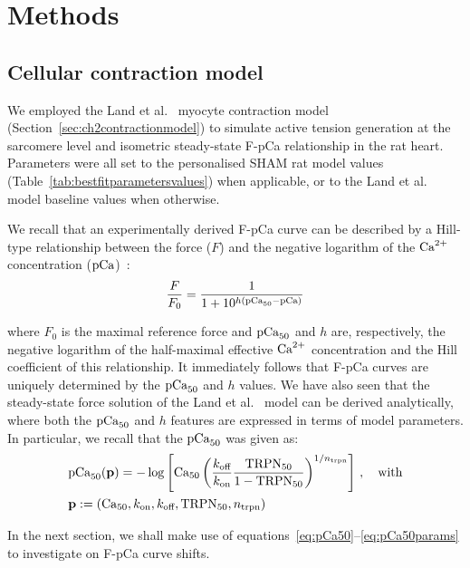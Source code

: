 %
%
%
\section{Methods}\label{sec:ch8methods}


%
%
%
\subsection{Cellular contraction model}\label{sec:cellcontr}
We employed the Land et al.~\cite{Land:2012} myocyte contraction model (Section~\ref{sec:ch2contractionmodel}) to simulate active tension generation at the sarcomere level and isometric steady-state F-pCa relationship in the rat heart. Parameters were all set to the personalised SHAM rat model values (Table~\ref{tab:bestfitparametersvalues}) when applicable, or to the Land et al.~\cite{Land:2012} model baseline values when otherwise.

\vspace{0.2cm}
We recall that an experimentally derived F-pCa curve can be described by a Hill-type relationship between the force ($F$) and the negative logarithm of the $\textrm{Ca}^{2+}$ concentration ($\textrm{pCa}$)~\cite{Walker:2010}:
%
\begin{equation}
    \frac{F}{F_0} = \frac{1}{1+10^{h(\textrm{pCa}_{50}-\textrm{pCa})}}
\end{equation}

\noindent
where $F_{0}$ is the maximal reference force and $\textrm{pCa}_{50}$ and $h$ are, respectively, the negative logarithm of the half-maximal effective $\textrm{Ca}^{2+}$ concentration and the Hill coefficient of this relationship. It immediately follows that F-pCa curves are uniquely determined by the $\textrm{pCa}_{50}$ and $h$ values. We have also seen that the steady-state force solution of the Land et al.~\cite{Land:2012} model can be derived analytically, where both the $\textrm{pCa}_{50}$ and $h$ features are expressed in terms of model parameters. In particular, we recall that the $\textrm{pCa}_{50}$ was given as:
%
\begin{align}
    & \textrm{pCa}_{50}(\mathbf{p}) =  -\log\left[\textrm{Ca}_{50}\left(\frac{k_{\textrm{off}}}{k_{\textrm{on}}}\frac{\textrm{TRPN}_{50}}{1-\textrm{TRPN}_{50}}\right)^{1/n_{\textrm{trpn}}}\right]\,,\quad\text{with} \label{eq:pCa50}\\
    & \mathbf{p} := (\textrm{Ca}_{50}, k_{\textrm{on}}, k_{\textrm{off}}, \textrm{TRPN}_{50}, n_{\textrm{trpn}}) \label{eq:pCa50params}
\end{align}

\vspace{0.2cm}\noindent
In the next section, we shall make use of equations~\eqref{eq:pCa50}--\eqref{eq:pCa50params} to investigate on F-pCa curve shifts. 


